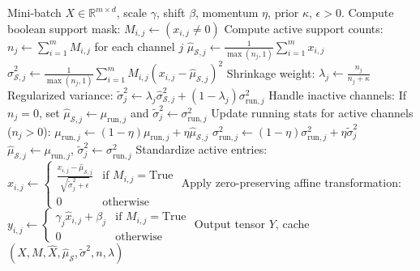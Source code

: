 \documentclass[twocolumn,10pt]{article}
\begin{document}
\begin{algorithm}[t]
\caption{SC-ZPBN Forward Pass}
\label{alg:forward}
\begin{algorithmic}[1]
\Require Mini-batch $X \in \mathbb{R}^{m \times d}$, scale $\gamma$, shift $\beta$, momentum $\eta$, prior $\kappa$, $\epsilon > 0$.
\State Compute boolean support mask: $M_{i,j} \gets (x_{i,j} \neq 0)$
\State Compute active support counts: $n_j \gets \sum_{i=1}^m M_{i,j}$ for each channel $j$
    \State $\hat{\mu}_{\mathcal{S}, j} \gets \frac{1}{\max(n_j, 1)}\sum_{i=1}^m x_{i,j}$
    \State $\hat{\sigma}_{\mathcal{S}, j}^2 \gets \frac{1}{\max(n_j, 1)}\sum_{i=1}^m M_{i,j}(x_{i,j} - \hat{\mu}_{\mathcal{S}, j})^2$
    \State Shrinkage weight: $\lambda_j \gets \frac{n_j}{n_j + \kappa}$
    \State Regularized variance: $\tilde{\sigma}_j^2 \gets \lambda_j \hat{\sigma}_{\mathcal{S}, j}^2 + (1 - \lambda_j)\sigma_{\mathrm{run}, j}^2$
    \State Handle inactive channels: If $n_j = 0$, set $\hat{\mu}_{\mathcal{S},j} \gets \mu_{\mathrm{run},j}$ and $\tilde{\sigma}_j^2 \gets \sigma_{\mathrm{run},j}^2$
    \State Update running stats for active channels ($n_j > 0$):
    \State \quad $\mu_{\mathrm{run}, j} \gets (1 - \eta)\mu_{\mathrm{run}, j} + \eta \hat{\mu}_{\mathcal{S}, j}$
    \State \quad $\sigma_{\mathrm{run}, j}^2 \gets (1 - \eta)\sigma_{\mathrm{run}, j}^2 + \eta \tilde{\sigma}_j^2$
\Else {}
    \State $\hat{\mu}_{\mathcal{S}, j} \gets \mu_{\mathrm{run}, j}$, \quad $\tilde{\sigma}_j^2 \gets \sigma_{\mathrm{run}, j}^2$
\EndIf
\State Standardize active entries:
\State $\hat{x}_{i,j} \gets \begin{cases} \frac{x_{i,j} - \hat{\mu}_{\mathcal{S}, j}}{\sqrt{\tilde{\sigma}_j^2 + \epsilon}} & \text{if } M_{i,j} = \text{True} \\ 0 & \text{otherwise} \end{cases}$
\State Apply zero-preserving affine transformation:
\State $y_{i,j} \gets \begin{cases} \gamma_j \hat{x}_{i,j} + \beta_j & \text{if } M_{i,j} = \text{True} \\ 0 & \text{otherwise} \end{cases}$
\State \Return Output tensor $Y$, cache $(X, M, \hat{X}, \hat{\mu}_{\mathcal{S}}, \tilde{\sigma}^2, n, \lambda)$
\end{algorithmic}
\end{algorithm}
\end{document}

